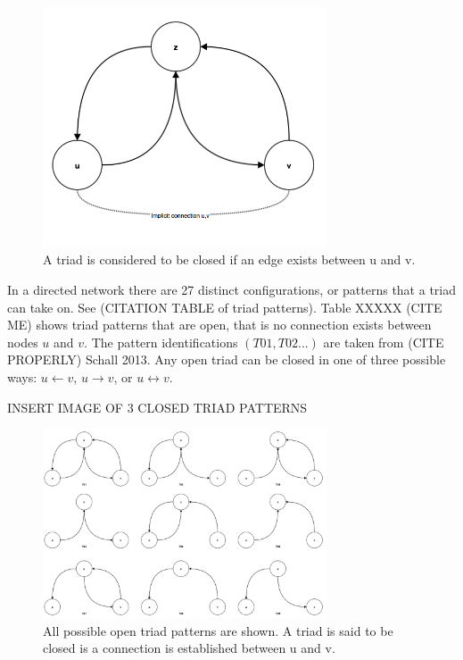 \begin{figure}[H]
  \centering
  \includegraphics[width=0.75\textwidth]{images/thesis_triad_example.png}
  \caption[closed triad patterns]{A triad is considered to be closed if an edge exists between u and v.}
  \label{thesis_closed_triads}
\end{figure}


In a directed network there are 27 distinct configurations, or patterns that a triad can take on. See (CITATION TABLE of triad patterns). Table XXXXX (CITE ME) shows triad patterns that are open, that is no connection exists between nodes $u$ and $v$. The pattern identifications $(T01, T02...)$ are taken from (CITE PROPERLY) Schall 2013. Any open triad can be closed in one of three possible ways: $u \leftarrow v$, $u \rightarrow v$, or $u \leftrightarrow v$.

INSERT IMAGE OF 3 CLOSED TRIAD PATTERNS 
\begin{figure}[H]
  \centering
  \includegraphics[width=0.75\textwidth]{images/thesis_triad_patterns.png}
  \caption[triad patterns]{All possible open triad patterns are shown. A triad is said to be closed is a connection is established between u and v.}
  \label{thesis_triad_patterns}
\end{figure}


